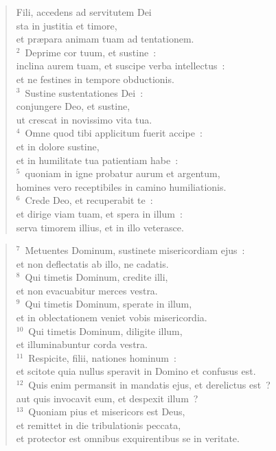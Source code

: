 \begin{flushleft}\begin{verse}\vspace{-19pt}Fili, accedens ad servitutem Dei\\ sta in justitia et timore,\\ et pr\ae para animam tuam ad tentationem.\\
${}^{2}$~Deprime cor tuum, et sustine~:\\ inclina aurem tuam, et suscipe verba intellectus~:\\ et ne festines in tempore obductionis.\\
${}^{3}$~Sustine sustentationes Dei~:\\ conjungere Deo, et sustine,\\ ut crescat in novissimo vita tua.\\
${}^{4}$~Omne quod tibi applicitum fuerit accipe~:\\ et in dolore sustine,\\ et in humilitate tua patientiam habe~:\\
${}^{5}$~quoniam in igne probatur aurum et argentum,\\ homines vero receptibiles in camino humiliationis.\\
${}^{6}$~Crede Deo, et recuperabit te~:\\ et dirige viam tuam, et spera in illum~:\\ serva timorem illius, et in illo veterasce.\end{verse}\end{flushleft}


\begin{flushleft}\begin{verse}${}^{7}$~Metuentes Dominum, sustinete misericordiam ejus~:\\ et non deflectatis ab illo, ne cadatis.\\
${}^{8}$~Qui timetis Dominum, credite illi,\\ et non evacuabitur merces vestra.\\
${}^{9}$~Qui timetis Dominum, sperate in illum,\\ et in oblectationem veniet vobis misericordia.\\
${}^{10}$~Qui timetis Dominum, diligite illum,\\ et illuminabuntur corda vestra.\\
${}^{11}$~Respicite, filii, nationes hominum~:\\ et scitote quia nullus speravit in Domino et confusus est.\\
${}^{12}$~Quis enim permansit in mandatis ejus, et derelictus est~?\\ aut quis invocavit eum, et despexit illum~?\\
${}^{13}$~Quoniam pius et misericors est Deus,\\ et remittet in die tribulationis peccata,\\ et protector est omnibus exquirentibus se in veritate.\end{verse}\end{flushleft}


